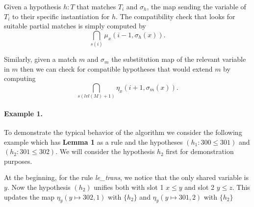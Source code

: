 \documentclass[runningheads]{llncs}
\newcommand{\xcom}[1]{{\color{cyan}{Xavier: #1}} }
\begin{document}
Given a hypothesis $h : T$ that matches $T_i$ and $\sigma_h$,
the map sending the variable of $T_i$ to their specific instantiation for $h$.
The compatibility check that looks for suitable partial matches is simply computed by
$$\bigcap_{s(i)} \mu_x \left(i - 1, \sigma_h(x)\right).$$

Similarly, given a match $m$ and $\sigma_m$ the substitution map of the relevant 
variable in $m$ then we can check for compatible hypotheses that would extend $m$
by computing 
$$\bigcap_{s(lvl(M) + 1)} \eta_x \left(i + 1, \sigma_m(x)\right).$$

\paragraph{Example 1.}
\xcom{WIP}
To demonstrate the typical behavior of the algorithm we consider the
following example which has \textbf{Lemma 1} as a rule and the hypotheses
$(h_1 : 300 \leq 301)$ and $(h_2 : 301 \leq 302)$. \xcom{format this.}
We will consider the hypothesis $h_2$ first for demonstration purposes.

At the beginning, for the rule \textit{le\_trans}, we notice that the
only shared variable is ${y}$. Now the hypothesis $(h_2)$ unifies both
with slot 1 $x \leq y$ and slot 2 $y \leq z$.
This updates the map $\eta_y(y \mapsto 302, 1)$ with $\{h_2\}$ and 
$\eta_y(y \mapsto 301, 2)$ with $\{h_2\}$

\end{document}
